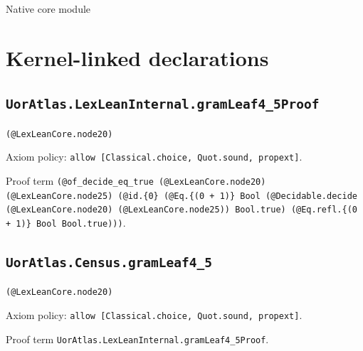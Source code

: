 \documentclass[11pt]{article}
\begin{document}
\begin{center}{\LARGE Native core module}\end{center}
\section*{Kernel-linked declarations}
\subsection*{\texttt{UorAtlas.LexLeanInternal.gramLeaf4\_5Proof}}
\noindent\texttt{(@LexLeanCore.node20)}\par
\noindent Axiom policy: \texttt{allow [Classical.choice, Quot.sound, propext]}.\par
\noindent Proof term \texttt{(@of\_decide\_eq\_true (@LexLeanCore.node20) (@LexLeanCore.node25) (@id.\{0\} (@Eq.\{(0 + 1)\} Bool (@Decidable.decide (@LexLeanCore.node20) (@LexLeanCore.node25)) Bool.true) (@Eq.refl.\{(0 + 1)\} Bool Bool.true)))}.\par
\subsection*{\texttt{UorAtlas.Census.gramLeaf4\_5}}
\noindent\texttt{(@LexLeanCore.node20)}\par
\noindent Axiom policy: \texttt{allow [Classical.choice, Quot.sound, propext]}.\par
\noindent Proof term \texttt{UorAtlas.LexLeanInternal.gramLeaf4\_5Proof}.\par
\end{document}
